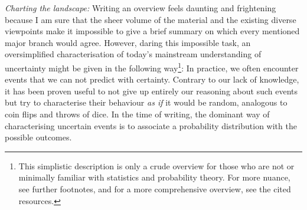 \documentclass{article}
\begin{document}
{\it Charting the landscape:}
Writing an overview feels daunting and frightening because I am sure that the sheer volume of the material and the existing diverse viewpoints make it impossible to give a brief summary on which every mentioned major branch would agree. However, daring this impossible task, an oversimplified characterisation of today's mainstream understanding of uncertainty might be given in the following way\footnote{This simplistic description is only a crude overview for those who are not or minimally familiar with statistics and probability theory. For more nuance, see further footnotes, and for a more comprehensive overview, see the cited resources.}:
In practice, we often encounter events that we can not predict with certainty. Contrary to our lack of knowledge, it has been proven useful to not give up entirely our reasoning about such events but try to characterise their behaviour \emph{as if} it would be random, analogous to coin flips and throws of dice. In the time of writing, the dominant way of characterising uncertain events is to associate a probability distribution with the possible outcomes.
\end{document}
